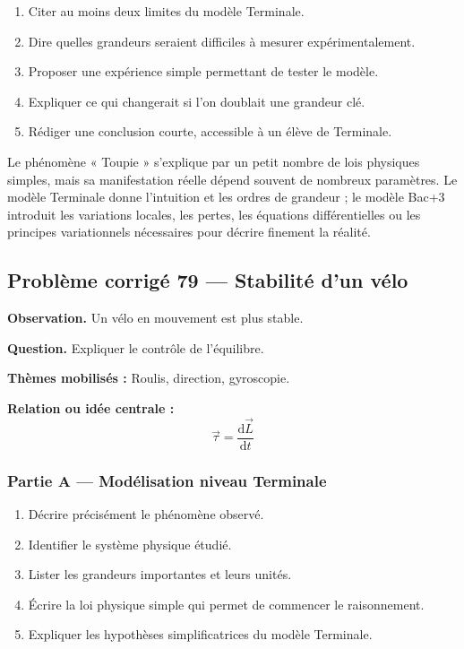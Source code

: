 \documentclass[11pt,a4paper]{article}
\begin{document}
\begin{enumerate}
  \item Citer au moins deux limites du modèle Terminale.
  \item Dire quelles grandeurs seraient difficiles à mesurer expérimentalement.
  \item Proposer une expérience simple permettant de tester le modèle.
  \item Expliquer ce qui changerait si l'on doublait une grandeur clé.
  \item Rédiger une conclusion courte, accessible à un élève de Terminale.
\end{enumerate}

\begin{corrigebox}
Le phénomène « Toupie » s'explique par un petit nombre de lois physiques simples, mais sa manifestation réelle dépend souvent de nombreux paramètres. Le modèle Terminale donne l'intuition et les ordres de grandeur ; le modèle Bac+3 introduit les variations locales, les pertes, les équations différentielles ou les principes variationnels nécessaires pour décrire finement la réalité.
\end{corrigebox}

\subsection{Problème corrigé 79 — Stabilité d'un vélo}

\begin{exercicebox}
\textbf{Observation.} Un vélo en mouvement est plus stable.

\medskip
\textbf{Question.} Expliquer le contrôle de l'équilibre.

\medskip
\textbf{Thèmes mobilisés :} Roulis, direction, gyroscopie.

\medskip
\textbf{Relation ou idée centrale :}
\[
\vec\tau=\frac{\mathrm d\vec L}{\mathrm dt}
\]
\end{exercicebox}

\subsubsection*{Partie A — Modélisation niveau Terminale}

\begin{enumerate}
  \item Décrire précisément le phénomène observé.
  \item Identifier le système physique étudié.
  \item Lister les grandeurs importantes et leurs unités.
  \item Écrire la loi physique simple qui permet de commencer le raisonnement.
  \item Expliquer les hypothèses simplificatrices du modèle Terminale.
\end{enumerate}
\end{document}
